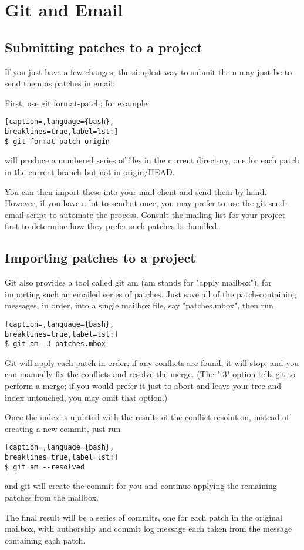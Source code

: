 \section{Git and Email}
\subsection{Submitting patches to a project}
If you just have a few changes, the simplest way to submit them may just be to
send them as patches in email:

First, use git format-patch; for example:
\lstset{basicstyle=\scriptsize, numbers=none, captionpos=b, tabsize=4}
\begin{lstlisting}[caption=,language={bash},
breaklines=true,label=lst:]
$ git format-patch origin
\end{lstlisting}

will produce a numbered series of files in the current directory, one for each
patch in the current branch but not in origin/HEAD.

You can then import these into your mail client and send them by hand. However,
if you have a lot to send at once, you may prefer to use the git send-email
script to automate the process. Consult the mailing list for your project first
to determine how they prefer such patches be handled.

\subsection{Importing patches to a project}
Git also provides a tool called git am (am stands for "apply mailbox"), for
importing such an emailed series of patches. Just save all of the
patch-containing messages, in order, into a single mailbox file, say
"patches.mbox", then run
\lstset{basicstyle=\scriptsize, numbers=none, captionpos=b, tabsize=4}
\begin{lstlisting}[caption=,language={bash},
breaklines=true,label=lst:]
$ git am -3 patches.mbox
\end{lstlisting}

Git will apply each patch in order; if any conflicts are found, it will stop,
and you can manually fix the conflicts and resolve the merge. (The "-3" option
tells git to perform a merge; if you would prefer it just to abort and leave
your tree and index untouched, you may omit that option.)

Once the index is updated with the results of the conflict resolution, instead
of creating a new commit, just run
\lstset{basicstyle=\scriptsize, numbers=none, captionpos=b, tabsize=4}
\begin{lstlisting}[caption=,language={bash},
breaklines=true,label=lst:]
$ git am --resolved
\end{lstlisting}

and git will create the commit for you and continue applying the remaining patches from the mailbox.

The final result will be a series of commits, one for each patch in the original mailbox, with authorship and commit log message each taken from the message containing each patch.
